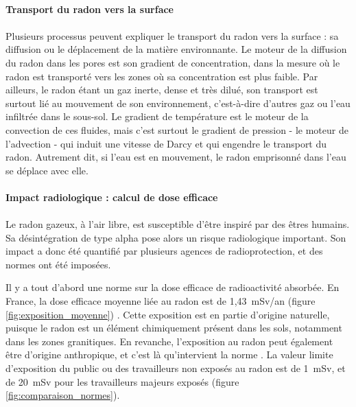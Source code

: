 \documentclass{article}
\begin{document}
\paragraph{Transport du radon vers la surface}

\paragraph{} Plusieurs processus peuvent expliquer le transport du radon vers la surface \cite{irsn_ineris_radon_nodate} : sa diffusion ou le déplacement de la matière environnante. Le moteur de la diffusion du radon dans les pores est son gradient de concentration, dans la mesure où le radon est transporté vers les zones où sa concentration est plus faible. Par ailleurs, le radon étant un gaz inerte, dense et très dilué, son transport est surtout lié au mouvement de son environnement, c’est-à-dire d’autres gaz ou l’eau infiltrée dans le sous-sol. Le gradient de température est le moteur de la convection de ces fluides, mais c’est surtout le gradient de pression - le moteur de l’advection - qui induit une vitesse de Darcy et qui engendre le transport du radon. Autrement dit, si l’eau est en mouvement, le radon emprisonné dans l’eau se déplace avec elle.

\paragraph{Impact radiologique : calcul de dose efficace}

\paragraph{} Le radon gazeux, à l’air libre, est susceptible d’être inspiré par des êtres humains. Sa désintégration de type alpha pose alors un risque radiologique important. Son impact a donc été quantifié par plusieurs agences de radioprotection, et des normes ont été imposées.

Il y a tout d’abord une norme sur la dose efficace de radioactivité absorbée. En France, la dose efficace moyenne liée au radon est de 1,43~mSv/an (figure \ref{fig:exposition_moyenne}) \cite{irsn_quelle_nodate}. Cette exposition est en partie d’origine naturelle, puisque le radon est un élément chimiquement présent dans les sols, notamment dans les zones granitiques. En revanche, l’exposition au radon peut également être d’origine anthropique, et c’est là qu’intervient la norme \cite{inrs_rayonnements_nodate}. La valeur limite d’exposition du public ou des travailleurs non exposés au radon est de 1~mSv, et de 20~mSv pour les travailleurs majeurs exposés (figure \ref{fig:comparaison_normes}).
\end{document}

